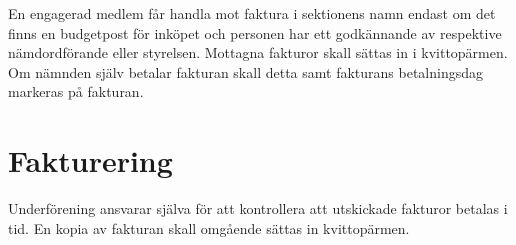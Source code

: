 \documentclass{dgovdoc}
\begin{document}
En engagerad medlem får handla mot faktura i sektionens namn endast om det finns en budgetpost för inköpet och personen har ett godkännande av respektive nämdordförande eller styrelsen. Mottagna fakturor skall sättas in i kvittopärmen. Om nämnden själv betalar fakturan skall detta samt fakturans betalningsdag markeras på fakturan. 

\section{Fakturering}

Underförening ansvarar själva för att kontrollera att utskickade fakturor betalas i tid. En kopia av fakturan skall omgående sättas in kvittopärmen. 
\end{document}
